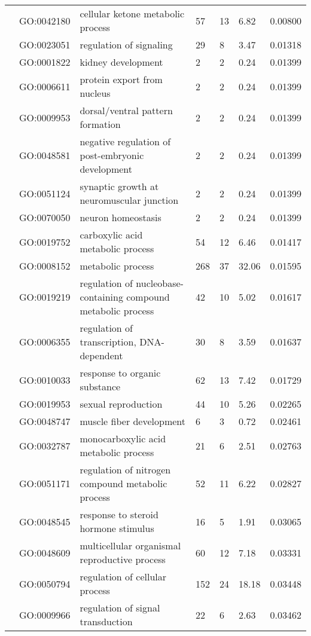 \documentclass[10pt]{bmc_article}
\newenvironment{bmcformat}{\begin{raggedright}\baselineskip20pt\sloppy\setboolean{publ}{false}}{\end{raggedright}\baselineskip20pt\sloppy}
\begin{document}
\begin{bmcformat}
\begin{longtable}{p{1.7cm}lp{4.5cm}p{1cm}p{1cm}ll}
   & GO:0042180 & cellular ketone metabolic process &  57 &  13 & 6.82 & 0.00800 \\ 
   & GO:0023051 & regulation of signaling &  29 &   8 & 3.47 & 0.01318 \\ 
   & GO:0001822 & kidney development &   2 &   2 & 0.24 & 0.01399 \\ 
   & GO:0006611 & protein export from nucleus &   2 &   2 & 0.24 & 0.01399 \\ 
   & GO:0009953 & dorsal/ventral pattern formation &   2 &   2 & 0.24 & 0.01399 \\ 
   & GO:0048581 & negative regulation of post-embryonic development &   2 &   2 & 0.24 & 0.01399 \\ 
   & GO:0051124 & synaptic growth at neuromuscular junction &   2 &   2 & 0.24 & 0.01399 \\ 
   & GO:0070050 & neuron homeostasis &   2 &   2 & 0.24 & 0.01399 \\ 
   & GO:0019752 & carboxylic acid metabolic process &  54 &  12 & 6.46 & 0.01417 \\ 
   & GO:0008152 & metabolic process & 268 &  37 & 32.06 & 0.01595 \\ 
   & GO:0019219 & regulation of nucleobase-containing compound metabolic process &  42 &  10 & 5.02 & 0.01617 \\ 
   & GO:0006355 & regulation of transcription, DNA-dependent &  30 &   8 & 3.59 & 0.01637 \\ 
   & GO:0010033 & response to organic substance &  62 &  13 & 7.42 & 0.01729 \\ 
   & GO:0019953 & sexual reproduction &  44 &  10 & 5.26 & 0.02265 \\ 
   & GO:0048747 & muscle fiber development &   6 &   3 & 0.72 & 0.02461 \\ 
   & GO:0032787 & monocarboxylic acid metabolic process &  21 &   6 & 2.51 & 0.02763 \\ 
   & GO:0051171 & regulation of nitrogen compound metabolic process &  52 &  11 & 6.22 & 0.02827 \\ 
   & GO:0048545 & response to steroid hormone stimulus &  16 &   5 & 1.91 & 0.03065 \\ 
   & GO:0048609 & multicellular organismal reproductive process &  60 &  12 & 7.18 & 0.03331 \\ 
   & GO:0050794 & regulation of cellular process & 152 &  24 & 18.18 & 0.03448 \\ 
   & GO:0009966 & regulation of signal transduction &  22 &   6 & 2.63 & 0.03462 \\ 

\end{longtable}
\end{bmcformat}
\end{document}
